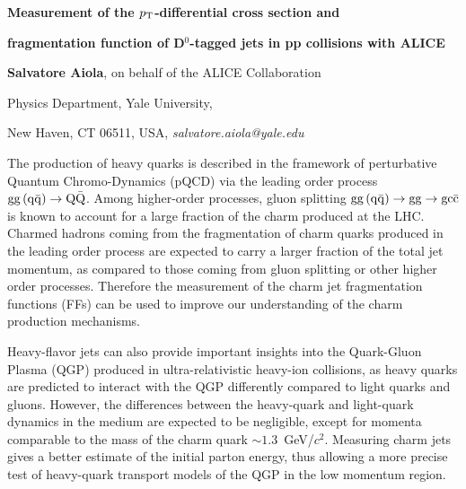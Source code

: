\documentclass[12pt]{article}
\begin{document}
\centerline{\bf 
Measurement of the $p_{\rm T}$-differential cross section and
}

\centerline{\bf 
fragmentation function of D$^0$-tagged jets in pp collisions with ALICE
}

\vspace{12pt}

\centerline{ {\bf Salvatore Aiola}, on behalf of the ALICE Collaboration }

\vspace{12pt}

\centerline{Physics Department, Yale University,
}\centerline{New Haven, CT 06511, USA, {\it salvatore.aiola@yale.edu}}

\vspace{12pt}


\vspace{12pt} \vspace{12pt}

The production of heavy quarks is described in the framework of perturbative Quantum Chromo-Dynamics (pQCD) via the leading order process ${\rm gg\, (q\bar{q})} \rightarrow {\rm Q\bar{Q}}$.
Among higher-order processes, gluon splitting ${\rm gg\, (q\bar{q})} \rightarrow {\rm gg} \rightarrow \rm gc\bar{c}$
is known to account for a large fraction of the charm produced at the LHC.
Charmed hadrons coming from the fragmentation of charm quarks
produced in the leading order process
are expected to carry a larger fraction of the total jet momentum,
as compared to those coming from gluon splitting or other higher order processes. 
Therefore the measurement of the charm jet fragmentation functions (FFs) 
can be used to improve our understanding of the charm production mechanisms.

Heavy-flavor jets can also provide important insights into the Quark-Gluon Plasma (QGP)
produced in ultra-relativistic heavy-ion collisions, as heavy quarks are predicted
to interact with the QGP differently compared to light quarks and gluons. 
However, the differences between the heavy-quark and light-quark dynamics in the medium
are expected to be negligible, except for momenta comparable to the mass of the charm quark $\sim 1.3$~GeV/$c^2$.
Measuring charm jets gives a better estimate of the initial parton energy,
thus allowing a more precise test of heavy-quark transport models of the QGP in the low momentum region.
\end{document}
